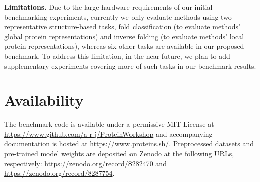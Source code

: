 \documentclass{article}
\begin{document}

\textbf{Limitations.} Due to the large hardware requirements of our initial benchmarking experiments, currently we only evaluate methods using two representative structure-based tasks, fold classification (to evaluate methods' global protein representations) and inverse folding (to evaluate methods' local protein representations), whereas six other tasks are available in our proposed benchmark. To address this limitation, in the near future, we plan to add supplementary experiments covering more of such tasks in our benchmark results.

\section{Availability}

The benchmark code is available under a permissive MIT License at \url{https://www.github.com/a-r-j/ProteinWorkshop} and accompanying documentation is hosted at \url{https://www.proteins.sh/}. Preprocessed datasets and pre-trained model weights are deposited on Zenodo at the following URLs, respectively: \url{https://zenodo.org/record/8282470} and \url{https://zenodo.org/record/8287754}.


\end{document}
